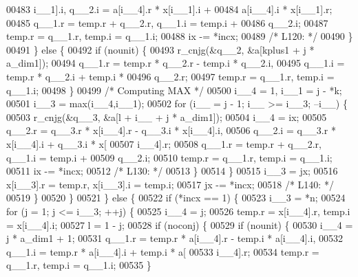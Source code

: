 \begin{DoxyCode}
00483                     i\_\_1].i, q\_\_2.i = a[i\_\_4].r * x[i\_\_1].i + 
00484                     a[i\_\_4].i * x[i\_\_1].r;
00485                 q\_\_1.r = temp.r + q\_\_2.r, q\_\_1.i = temp.i + 
00486                     q\_\_2.i;
00487                 temp.r = q\_\_1.r, temp.i = q\_\_1.i;
00488                 ix -= *incx;
00489 \textcolor{comment}{/* L120: */}
00490             \}
00491             \} \textcolor{keywordflow}{else} \{
00492             \textcolor{keywordflow}{if} (nounit) \{
00493                 r\_cnjg(&q\_\_2, &a[kplus1 + j * a\_dim1]);
00494                 q\_\_1.r = temp.r * q\_\_2.r - temp.i * q\_\_2.i, 
00495                     q\_\_1.i = temp.r * q\_\_2.i + temp.i * 
00496                     q\_\_2.r;
00497                 temp.r = q\_\_1.r, temp.i = q\_\_1.i;
00498             \}
00499 \textcolor{comment}{/* Computing MAX */}
00500             i\_\_4 = 1, i\_\_1 = j - *k;
00501             i\_\_3 = max(i\_\_4,i\_\_1);
00502             \textcolor{keywordflow}{for} (i\_\_ = j - 1; i\_\_ >= i\_\_3; --i\_\_) \{
00503                 r\_cnjg(&q\_\_3, &a[l + i\_\_ + j * a\_dim1]);
00504                 i\_\_4 = ix;
00505                 q\_\_2.r = q\_\_3.r * x[i\_\_4].r - q\_\_3.i * x[i\_\_4].i, 
00506                     q\_\_2.i = q\_\_3.r * x[i\_\_4].i + q\_\_3.i * x[
00507                     i\_\_4].r;
00508                 q\_\_1.r = temp.r + q\_\_2.r, q\_\_1.i = temp.i + 
00509                     q\_\_2.i;
00510                 temp.r = q\_\_1.r, temp.i = q\_\_1.i;
00511                 ix -= *incx;
00512 \textcolor{comment}{/* L130: */}
00513             \}
00514             \}
00515             i\_\_3 = jx;
00516             x[i\_\_3].r = temp.r, x[i\_\_3].i = temp.i;
00517             jx -= *incx;
00518 \textcolor{comment}{/* L140: */}
00519         \}
00520         \}
00521     \} \textcolor{keywordflow}{else} \{
00522         \textcolor{keywordflow}{if} (*incx == 1) \{
00523         i\_\_3 = *n;
00524         \textcolor{keywordflow}{for} (j = 1; j <= i\_\_3; ++j) \{
00525             i\_\_4 = j;
00526             temp.r = x[i\_\_4].r, temp.i = x[i\_\_4].i;
00527             l = 1 - j;
00528             \textcolor{keywordflow}{if} (noconj) \{
00529             \textcolor{keywordflow}{if} (nounit) \{
00530                 i\_\_4 = j * a\_dim1 + 1;
00531                 q\_\_1.r = temp.r * a[i\_\_4].r - temp.i * a[i\_\_4].i, 
00532                     q\_\_1.i = temp.r * a[i\_\_4].i + temp.i * a[
00533                     i\_\_4].r;
00534                 temp.r = q\_\_1.r, temp.i = q\_\_1.i;
00535             \}

\end{DoxyCode}
